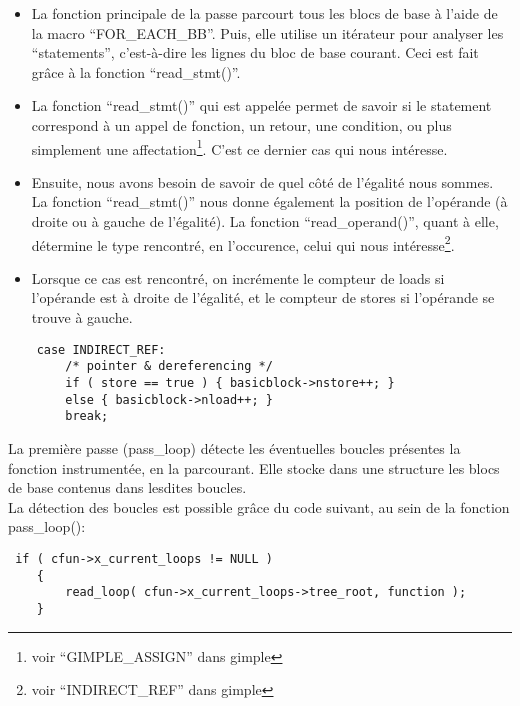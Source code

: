\begin{itemize}

\item La fonction principale de la passe parcourt tous les blocs de base à l'aide de la macro ``FOR\_EACH\_BB''. Puis, elle utilise un itérateur pour analyser les ``statements'', c'est-à-dire les lignes du bloc de base courant. Ceci est fait grâce à la fonction ``read\_stmt()''.\\

\item La fonction ``read\_stmt()'' qui est appelée permet de savoir si le statement correspond à un appel de fonction, un retour, une condition, ou plus simplement une affectation\footnote{voir ``GIMPLE\_ASSIGN'' dans gimple}. C'est ce dernier cas qui nous intéresse.\\

\item Ensuite, nous avons besoin de savoir de quel côté de l'égalité nous sommes. La fonction ``read\_stmt()'' nous donne également la position de l'opérande (à droite ou à gauche de l'égalité). La fonction ``read\_operand()'', quant à elle, détermine le type rencontré, en l'occurence, celui qui nous intéresse\footnote{voir ``INDIRECT\_REF'' dans gimple}.\\

\item Lorsque ce cas est rencontré, on incrémente le compteur de loads si l'opérande est à droite de l'égalité, et le compteur de stores si l'opérande se trouve à gauche.\\

\end{itemize}

\begin{verbatim}
	case INDIRECT_REF:
	    /* pointer & dereferencing */
	    if ( store == true ) { basicblock->nstore++; }
	    else { basicblock->nload++; }
	    break;
\end{verbatim}

La première passe (pass\_loop) détecte les éventuelles boucles présentes la fonction instrumentée, en la parcourant. Elle stocke dans une structure les blocs de base contenus dans lesdites boucles.\\
La détection des boucles est possible grâce du code suivant, au sein de la fonction pass\_loop():
\begin{verbatim}
 if ( cfun->x_current_loops != NULL )
	{
	    read_loop( cfun->x_current_loops->tree_root, function );
	}
\end{verbatim}

